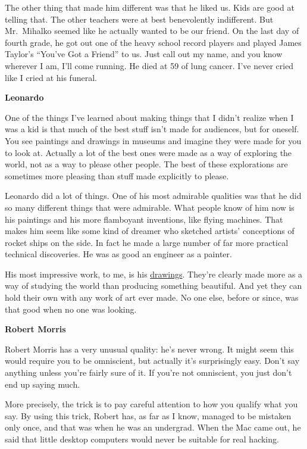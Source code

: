 The other thing that made him different was that he liked us. Kids are
good at telling that. The other teachers were at best benevolently
indifferent. But Mr.~Mihalko seemed like he actually wanted to be our
friend. On the last day of fourth grade, he got out one of the heavy
school record players and played James Taylor's ``You've Got a Friend''
to us. Just call out my name, and you know wherever I am, I'll come
running. He died at 59 of lung cancer. I've never cried like I cried at
his funeral.

\textbf{Leonardo}

One of the things I've learned about making things that I didn't realize
when I was a kid is that much of the best stuff isn't made for
audiences, but for oneself. You see paintings and drawings in museums
and imagine they were made for you to look at. Actually a lot of the
best ones were made as a way of exploring the world, not as a way to
please other people. The best of these explorations are sometimes more
pleasing than stuff made explicitly to please.

Leonardo did a lot of things. One of his most admirable qualities was
that he did so many different things that were admirable. What people
know of him now is his paintings and his more flamboyant inventions,
like flying machines. That makes him seem like some kind of dreamer who
sketched artists' conceptions of rocket ships on the side. In fact he
made a large number of far more practical technical discoveries. He was
as good an engineer as a painter.

His most impressive work, to me, is his
\href{https://sep.turbifycdn.com/ty/cdn/paulgraham/leonardo-skull.jpg?t=1688221954&}{drawings}.
They're clearly made more as a way of studying the world than producing
something beautiful. And yet they can hold their own with any work of
art ever made. No one else, before or since, was that good when no one
was looking.

\textbf{Robert Morris}

Robert Morris has a very unusual quality: he's never wrong. It might
seem this would require you to be omniscient, but actually it's
surprisingly easy. Don't say anything unless you're fairly sure of it.
If you're not omniscient, you just don't end up saying much.

More precisely, the trick is to pay careful attention to how you qualify
what you say. By using this trick, Robert has, as far as I know, managed
to be mistaken only once, and that was when he was an undergrad. When
the Mac came out, he said that little desktop computers would never be
suitable for real hacking.

